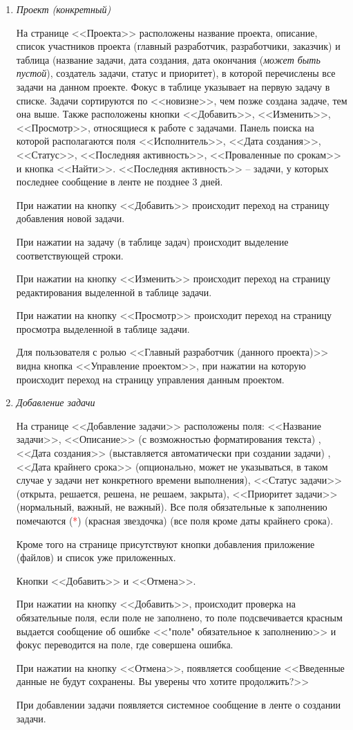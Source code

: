 \documentclass[14pt,a4paper]{extarticle}
\begin{document}
\begin{enumerate}
		\item {\it Проект (конкретный)}
		\par На странице <<Проекта>> расположены название проекта, описание, список участников проекта (главный разработчик, разработчики, заказчик) и таблица (название задачи, дата создания, дата окончания ({\it может быть пустой}), создатель задачи, статус и приоритет), в которой перечислены все задачи на данном проекте. Фокус в таблице указывает на первую задачу в списке. Задачи сортируются по <<новизне>>, чем позже создана задаче, тем она выше. Также расположены кнопки <<Добавить>>, <<Изменить>>, <<Просмотр>>, относящиеся к работе с задачами. Панель поиска на которой располагаются поля <<Исполнитель>>, <<Дата создания>>, <<Статус>>, <<Последняя активность>>, <<Проваленные по срокам>> и кнопка <<Найти>>. <<Последняя активность>> -- задачи, у которых последнее сообщение в ленте не позднее 3 дней.
		\par При нажатии на кнопку <<Добавить>> происходит переход на страницу добавления новой задачи.
		\par При нажатии на задачу (в таблице задач) происходит выделение соответствующей строки.
		\par При нажатии на кнопку <<Изменить>> происходит переход на страницу редактирования выделенной в таблице задачи.
		\par При нажатии на кнопку <<Просмотр>> происходит переход на страницу просмотра выделенной в таблице задачи.
		\par Для пользователя с ролью <<Главный разработчик (данного проекта)>> видна кнопка <<Управление проектом>>, при нажатии на которую происходит переход на страницу управления данным проектом.
		
		\item {\it Добавление задачи}
		\par На странице <<Добавление задачи>> расположены поля: <<Название задачи>>, <<Описание>> (с возможностью форматирования текста) , <<Дата создания>> (выставляется автоматически при создании задачи) , <<Дата крайнего срока>> (опционально, может не указываться, в таком случае у задачи нет конкретного времени выполнения), <<Статус задачи>> (открыта, решается, решена, не решаем, закрыта), <<Приоритет задачи>> (нормальный, важный, не важный). Все поля обязательные к заполнению помечаются (\textcolor{red}{*}) (красная звездочка) (все поля кроме даты крайнего срока).
		\par Кроме того на странице присутствуют кнопки добавления приложение (файлов) и список уже приложенных.
		\par Кнопки <<Добавить>> и <<Отмена>>.
		\par При нажатии на кнопку <<Добавить>>, происходит проверка на обязательные поля, если поле не заполнено, то поле подсвечивается красным выдается сообщение об ошибке <<"поле" обязательное к заполнению>> и фокус переводится на поле, где совершена ошибка.
		\par При нажатии на кнопку <<Отмена>>, появляется сообщение <<Введенные данные не будут сохранены. Вы уверены что хотите продолжить?>>
		\par При добавлении задачи появляется системное сообщение в ленте о создании задачи.


\end{enumerate}
\end{document}

